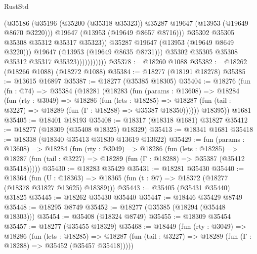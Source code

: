 \begin{lexlean}{RustStd}
\begin{coremodule}
                                  (@35186
                                    (@35196
                                      (@35200 (@35318 @35323))
                                      @35287
                                      @19647
                                      (@13953 (@19649 @8670 @3220)))
                                    @19647
                                    (@13953 (@19649 @8657 @8716)))
                                  @35302
                                  @35305
                                  @35308
                                  @35312
                                  @35317
                                  @35323))
                              @35287
                              @19647
                              (@13953 (@19649 @8649 @3220)))
                            @19647
                            (@13953 (@19649 @8635 @8731)))
                          @35302
                          @35305
                          @35308
                          @35312
                          @35317
                          @35323)))))))))))
@35378 := @18260 @1088
@35382 := @18262 (@18266 @1088) (@18272 @1088)
@35384 := @18277 (@18191 @18278)
@35385 := @13615 @16897
@35387 := @18277 (@35385 @18305)
@35404 := @18276
    (fun (fn : @74) =>
    @35384
      (@18281
        (@18283
          (fun (params : @13608) =>
          @18284
            (fun (rty : @3049) =>
            @18286
              (fun (lets : @18285) =>
              @18287 (fun (tail : @3227) => @18289 (fun (Γ : @18288) => @35387 @18350))))))
        @18395))
    @1681
@35405 := @18401 @18193
@35408 := @18317 (@18318 @1681) @31827
@35412 := @18277 (@18309 (@35408 @18325) @18329)
@35413 := @18341 @1681
@35418 := @18338 (@18340 @35413 @31830 @13619 @13622)
@35429 := fun (params : @13608) =>
  @18284
    (fun (rty : @3049) =>
    @18286
      (fun (lets : @18285) =>
      @18287 (fun (tail : @3227) => @18289 (fun (Γ : @18288) => @35387 (@35412 @35418)))))
@35430 := @18283 @35429
@35431 := @18281 @35430
@35440 := @18364
    (fun (U : @18363) => @18365 (fun (t : @7) => @18372 (@18277 (@18378 @31827 @13625) @18389)))
@35443 := @35405 (@35431 @35440) @31825
@35445 := @18262 @35430 @35440
@35447 := @18446 @35429 @8749
@35448 := @18295 @8749
@35452 := @18277 (@35385 (@18294 (@35448 @18303)))
@35454 := @35408 (@18324 @8749)
@35455 := @18309 @35454
@35457 := @18277 (@35455 @18329)
@35468 := @18449
    (fun (rty : @3049) =>
    @18286
      (fun (lets : @18285) =>
      @18287 (fun (tail : @3227) => @18289 (fun (Γ : @18288) => @35452 (@35457 @35418)))))

\end{coremodule}
\end{lexlean}
